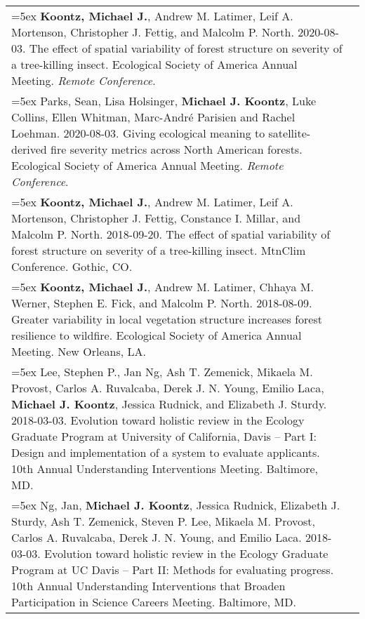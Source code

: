 \begin{longtable}{@{}>{\raggedright}p{5.25in} @{} >{\raggedleft}X@{}}

\hangindent=5ex \textbf{Koontz, Michael J.}, Andrew M. Latimer, Leif A. Mortenson, Christopher J. Fettig, and Malcolm P. North. 2020-08-03. The effect of spatial variability of forest structure on severity of a tree-killing insect. Ecological Society of America Annual Meeting. \emph{Remote Conference}. & 2020 \tabularnewline

\hangindent=5ex Parks, Sean, Lisa Holsinger, \textbf{Michael J. Koontz}, Luke Collins, Ellen Whitman, Marc-André Parisien and Rachel Loehman. 2020-08-03. Giving ecological meaning to satellite-derived fire severity metrics across North American forests. Ecological Society of America Annual Meeting. \emph{Remote Conference}. & 2020 \tabularnewline

\hangindent=5ex \textbf{Koontz, Michael J.}, Andrew M. Latimer, Leif A. Mortenson, Christopher J. Fettig, Constance I. Millar, and Malcolm P. North. 2018-09-20. The effect of spatial variability of forest structure on severity of a tree-killing insect. MtnClim Conference. Gothic, CO. & 2018 \tabularnewline

\hangindent=5ex \textbf{Koontz, Michael J.}, Andrew M. Latimer, Chhaya M. Werner, Stephen E. Fick, and Malcolm P. North. 2018-08-09. Greater variability in local vegetation structure increases forest resilience to wildfire. Ecological Society of America Annual Meeting. New Orleans, LA. & 2018 \tabularnewline

\hangindent=5ex Lee, Stephen P., Jan Ng, Ash T. Zemenick, Mikaela M. Provost, Carlos A. Ruvalcaba, Derek J. N. Young, Emilio Laca, \textbf{Michael J. Koontz}, Jessica Rudnick, and Elizabeth J. Sturdy. 2018-03-03. Evolution toward holistic review in the Ecology Graduate Program at University of California, Davis -- Part I: Design and implementation of a system to evaluate applicants. 10th Annual Understanding Interventions Meeting. Baltimore, MD. & 2018 \tabularnewline

\hangindent=5ex Ng, Jan, \textbf{Michael J. Koontz}, Jessica Rudnick, Elizabeth J. Sturdy, Ash T. Zemenick, Steven P. Lee, Mikaela M. Provost, Carlos A. Ruvalcaba, Derek J. N. Young, and Emilio Laca. 2018-03-03. Evolution toward holistic review in the Ecology Graduate Program at UC Davis -- Part II: Methods for evaluating progress. 10th Annual Understanding Interventions that Broaden Participation in Science Careers Meeting. Baltimore, MD. & 2018 \tabularnewline


\end{longtable}
